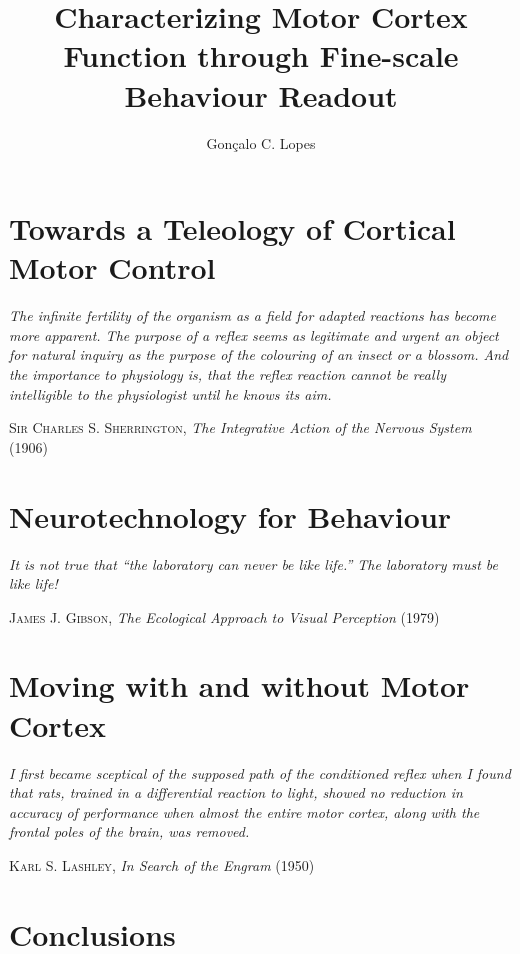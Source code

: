 \documentclass[11pt,lot,lof,b5paper]{puthesis}
\title{Characterizing Motor Cortex Function through Fine-scale Behaviour Readout}
\author{Gonçalo C. Lopes}
\let\originalepigraph\epigraph
\renewcommand\epigraph[2]{\originalepigraph{\textit{#1}}{#2}}
\renewcommand{\maketitlepage}{}
\begin{document}
% 
% 



\maketitlepage
\makefrontmatter



\chapter{Towards a Teleology of Cortical Motor Control}
\label{ch:teleology}
\epigraph{The infinite fertility of the organism as a field for adapted reactions has become more apparent. The purpose of a reflex seems as legitimate and urgent an object for natural inquiry as the purpose of the colouring of an insect or a blossom. And the importance to physiology is, that the reflex reaction cannot be really intelligible to the physiologist until he knows its aim.}{\textsc{Sir Charles S. Sherrington}, \textit{The Integrative Action of the Nervous System} (1906)}


\chapter{Neurotechnology for Behaviour}
\label{ch:tools}
\epigraph{It is not true that ``the laboratory can never be like life.'' The laboratory \emph{must} be like life!}{\textsc{James J. Gibson}, \textit{The Ecological Approach to Visual Perception} (1979)}


\chapter{Moving with and without Motor Cortex}
\label{ch:behaviour}
\epigraph{I first became sceptical of the supposed path of the conditioned reflex when I found that rats, trained in a differential reaction to light, showed no reduction in accuracy of performance when almost the entire motor cortex, along with the frontal poles of the brain, was removed.}{\textsc{Karl S. Lashley}, \textit{In Search of the Engram} (1950)}


\chapter{Conclusions}
\label{ch:conclusions}

\end{document}
